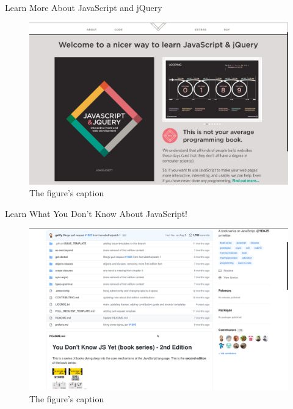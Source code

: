 \documentclass[14pt,aspectratio=169]{beamer}
\begin{document}
%
\begin{frame}{Learn More About JavaScript and jQuery}
  \begin{figure}
    \centering
    \includegraphics[scale=.085]{images/javascript-book.png}
    \caption{The figure's caption}
  \end{figure}
\end{frame}

%
\begin{frame}{Learn What You Don't Know About JavaScript!}
  \begin{figure}
    \centering
    \includegraphics[scale=.085]{images/dont-know-javascript.png}
    \caption{The figure's caption}
  \end{figure}
\end{frame}
\end{document}
